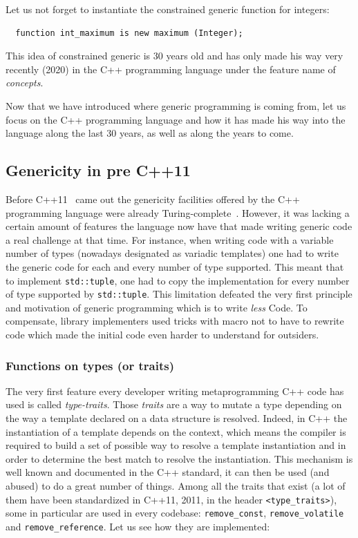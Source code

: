 Let us not forget to instantiate the constrained generic function for integers:

\begin{verbatim}
  function int_maximum is new maximum (Integer);
\end{verbatim}

This idea of constrained generic is 30 years old and has only made his way very recently (2020) in the C++ programming
language under the feature name of \emph{concepts}.

Now that we have introduced where generic programming is coming from, let us focus on the C++ programming language and
how it has made his way into the language along the last 30 years, as well as along the years to come.

\subsection{Genericity in pre C++11}
\label{sec:precpp11}

Before C++11~\parencite{iso.2011.cpp} came out the genericity facilities offered by the C++ programming language were
already Turing-complete~\parencite{veldhuizen.2003.c++templates}. However, it was lacking a certain amount of features
the language now have that made writing generic code a real challenge at that time. For instance, when writing code with
a variable number of types (nowadays designated as variadic templates) one had to write the generic code for each and
every number of type supported. This meant that to implement \texttt{std::tuple}, one had to copy the implementation for
every number of type supported by \texttt{std::tuple}. This limitation defeated the very first principle and motivation
of generic programming which is to write \emph{less} Code. To compensate, library implementers used tricks with macro
not to have to rewrite code which made the initial code even harder to understand for outsiders.


\subsubsection{Functions on types (or traits)}

The very first feature every developer writing metaprogramming C++ code has used is called \emph{type-traits}. Those
\emph{traits} are a way to mutate a type depending on the way a template declared on a data structure is resolved.
Indeed, in C++ the instantiation of a template depends on the context, which means the compiler is required to build a
set of possible way to resolve a template instantiation and in order to determine the best match to resolve the
instantiation. This mechanism is well known and documented in the C++ standard, it can then be used (and abused) to do a
great number of things. Among all the traits that exist (a lot of them have been standardized in C++11, 2011, in the
header \texttt{<type\_traits>}), some in particular are used in every codebase: \texttt{remove\_const},
\texttt{remove\_volatile} and \texttt{remove\_reference}. Let us see how they are implemented:

